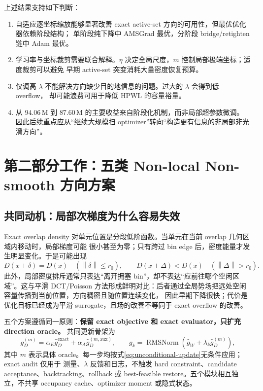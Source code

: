 \documentclass[UTF8,a4paper,11pt]{ctexart}
\newcommand{\norm}[1]{\left\lVert #1\right\rVert}
\newcommand{\rmsnorm}{\operatorname{RMSNorm}}
\begin{document}
上述结果支持如下判断：
\begin{enumerate}
  \item 自适应逐坐标缩放能够显著改善 exact active-set 方向的可用性，但最优优化器依赖阶段结构；
  单阶段纯下降中 AMSGrad 最优，分阶段 bridge/retighten 链中 Adam 最优。
  \item 学习率与坐标裁剪需要联合解释。$\eta$ 决定全局尺度，$m$ 控制局部极端坐标；适度裁剪可以避免
  早期 active-set 突变消耗大量密度恢复预算。
  \item 仅调高 $\lambda$ 不能解决方向缺少目的地信息的问题。过大的 $\lambda$ 会得到低 overflow，
  却可能浪费可用于降低 HPWL 的容量裕量。
  \item 从 $94.06\,\mathrm{M}$ 到 $87.60\,\mathrm{M}$ 的主要收益来自阶段化机制，而非局部超参数微调。
  因此后续重点应从“继续大规模扫 optimizer”转向“构造更有信息的非局部非光滑方向”。
\end{enumerate}

\section{第二部分工作：五类 Non-local Non-smooth 方向方案}

\subsection{共同动机：局部次梯度为什么容易失效}

Exact overlap density 对单元位置是分段低阶函数。当单元在当前 overlap 几何区域内移动时，局部梯度可能
很小甚至为零；只有跨过 bin edge 后，密度能量才发生明显变化。于是可能出现
\[
  D(x+\delta)=D(x)\quad (\norm{\delta}\le r_0),
  \qquad
  D(x+\Delta)<D(x)\quad (\norm{\Delta}>r_0).
\]
此外，局部密度排斥通常只表达“离开拥塞 bin”，却不表达“应前往哪个空闲区域”。这与平滑
DCT/Poisson 方法形成鲜明对比：后者通过全局势场把远处空闲容量传播到当前位置，方向稠密且随位置连续变化，
因此早期下降很快；代价是优化目标已经成为平滑 surrogate，且场的改善不等同于 exact overflow 的改善。

五个方案遵循同一原则：\textbf{保留 exact objective 和 exact evaluator，只扩充 direction oracle。}
共同更新骨架为
\begin{equation}
  g_D^{(m)}=\alpha_E\widehat g_D^{\mathrm{exact}}
  +\alpha_A\widehat g_D^{(m,\mathrm{aux})},
  \qquad
  g_k=\rmsnorm\!\left(\widehat g_W+\lambda_k\widehat g_D^{(m)}\right),
  \label{eq:nonlocal-common}
\end{equation}
其中 $m$ 表示具体 oracle。每一步均按式\eqref{eq:unconditional-update}无条件应用；exact audit 仅用于
测量、$\lambda$ 反馈和日志，不触发 hard constraint、candidate acceptance、backtracking、rollback 或
best-feasible restore。五个模块相互独立，不共享 occupancy cache、optimizer moment 或隐式状态。
\end{document}
